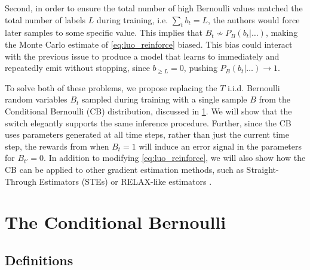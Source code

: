 \documentclass{article}
\begin{document}
Second, in order to ensure the total number of high Bernoulli values matched
the total number of labels $L$ during training, i.e. $\sum_t b_t = L$, the
authors would force later samples to some specific value. This implies that
$B_t \nsim P_B(b_t|\ldots)$, making the Monte Carlo estimate of
\cref{eq:luo_reinforce} biased. This bias could interact with the previous
issue to produce a model that learns to immediately and repeatedly emit without
stopping, since $b_{\geq L} = 0$, pushing $P_B(b_t|\ldots) \to 1$.

To solve both of these problems, we propose replacing the $T$ i.i.d. Bernoulli
random variables $B_t$ sampled during training with a single sample $B$ from
the Conditional Bernoulli (CB) distribution, discussed in \cref{sec:cb}. We
will show that the switch elegantly supports the same inference procedure.
Further, since the CB uses parameters generated at all time steps, rather than
just the current time step, the rewards from when $B_t = 1$ will induce an
error signal in the parameters for $B_{t'} = 0$. In addition to modifying
\cref{eq:luo_reinforce}, we will also show how the CB can be applied to other
gradient estimation methods, such as Straight-Through Estimators (STEs)
\cite{bengioEstimatingPropagatingGradients2013} or RELAX-like estimators
\cite{maddisonConcreteDistributionContinuous2017,grathwohlBackpropagationVoidOptimizing2018}.


\section{The Conditional Bernoulli} \label{sec:cb}
\subsection{Definitions} \label{sec:cb_defns}
\end{document}
